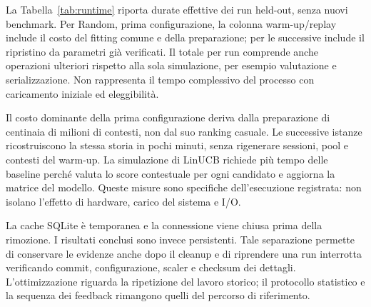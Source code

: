 La Tabella~\ref{tab:runtime} riporta durate effettive dei run held-out, senza nuovi benchmark. Per Random, prima configurazione, la colonna warm-up/replay include il costo del fitting comune e della preparazione; per le successive include il ripristino da parametri già verificati. Il totale per run comprende anche operazioni ulteriori rispetto alla sola simulazione, per esempio valutazione e serializzazione. Non rappresenta il tempo complessivo del processo con caricamento iniziale ed eleggibilità.

\begin{table}[htbp]\centering\small

\caption{Durate ufficiali del test, in minuti. La prima riga sostiene il costo comune del warm-up e non va interpretata come lentezza della policy Random.}\label{tab:runtime}
\end{table}

Il costo dominante della prima configurazione deriva dalla preparazione di centinaia di milioni di contesti, non dal suo ranking casuale. Le successive istanze ricostruiscono la stessa storia in pochi minuti, senza rigenerare sessioni, pool e contesti del warm-up. La simulazione di LinUCB richiede più tempo delle baseline perché valuta lo score contestuale per ogni candidato e aggiorna la matrice del modello. Queste misure sono specifiche dell'esecuzione registrata: non isolano l'effetto di hardware, carico del sistema e I/O.

La cache SQLite è temporanea e la connessione viene chiusa prima della rimozione. I risultati conclusi sono invece persistenti. Tale separazione permette di conservare le evidenze anche dopo il cleanup e di riprendere una run interrotta verificando commit, configurazione, scaler e checksum dei dettagli. L'ottimizzazione riguarda la ripetizione del lavoro storico; il protocollo statistico e la sequenza dei feedback rimangono quelli del percorso di riferimento.
